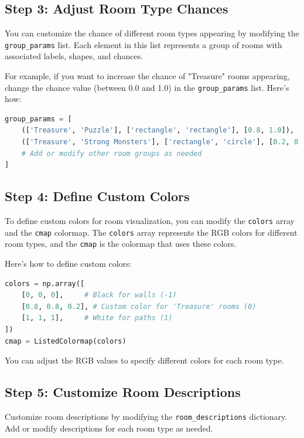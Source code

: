 \documentclass[10pt,twocolumn]{article}
\begin{document}
\subsection{Step 3: Adjust Room Type Chances}

You can customize the chance of different room types appearing by modifying the \texttt{group\_params} list. Each element in this list represents a group of rooms with associated labels, shapes, and chances.

For example, if you want to increase the chance of "Treasure" rooms appearing, change the chance value (between 0.0 and 1.0) in the \texttt{group\_params} list. Here's how:

\begin{lstlisting}[language=Python]
group_params = [
    (['Treasure', 'Puzzle'], ['rectangle', 'rectangle'], [0.8, 1.0]),  # Increase chance for 'Treasure'
    (['Treasure', 'Strong Monsters'], ['rectangle', 'circle'], [0.2, 0.6]),
    # Add or modify other room groups as needed
]
\end{lstlisting}

\subsection{Step 4: Define Custom Colors}

To define custom colors for room visualization, you can modify the \texttt{colors} array and the \texttt{cmap} colormap. The \texttt{colors} array represents the RGB colors for different room types, and the \texttt{cmap} is the colormap that uses these colors.

Here's how to define custom colors:

\begin{lstlisting}[language=Python]
colors = np.array([
    [0, 0, 0],     # Black for walls (-1)
    [0.8, 0.8, 0.2], # Custom color for 'Treasure' rooms (0)
    [1, 1, 1],     # White for paths (1)
])
cmap = ListedColormap(colors)
\end{lstlisting}

You can adjust the RGB values to specify different colors for each room type.

\subsection{Step 5: Customize Room Descriptions}

Customize room descriptions by modifying the \texttt{room\_descriptions} dictionary. Add or modify descriptions for each room type as needed.
\end{document}
